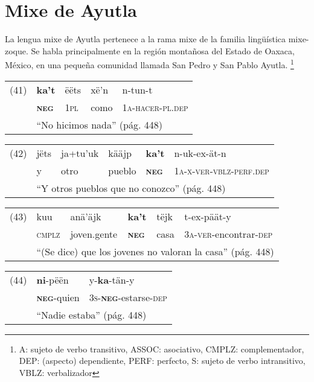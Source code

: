 \section*{Mixe de Ayutla}

\noindent La lengua mixe de Ayutla pertenece a la rama mixe de la familia lingüística mixe-zoque. Se habla principalmente en la región montañosa del Estado de Oaxaca, México, en una pequeña comunidad llamada San Pedro y San Pablo Ayutla. 
\footnote{A: sujeto de verbo transitivo, ASSOC: asociativo, CMPLZ: complementador, DEP: (aspecto) dependiente, PERF: perfecto, S: sujeto de verbo intransitivo, VBLZ: verbalizador}
\vspace{0.5cm}
{\setmainfont{Charis SIL} 

\begin{tabular}{lllll}
(41) & \textbf{ka't} & ëëts & xë'n & n-tun-t \\
& \textsc{\textbf{neg}} & \textsc{1pl} & como & \textsc{1a-hacer-pl.dep} \\
& \multicolumn{4}{l}{``No hicimos nada'' (pág. 448)}
\end{tabular} \vspace{0.3cm}

\begin{tabular}{llllll}
(42) & jëts & ja+tu'uk & kääjp & \textbf{ka't} & n-uk-ex-ät-n \\
& y & otro & pueblo & \textsc{\textbf{neg}} & \textsc{1a-x-ver-vblz-perf.dep} \\
& \multicolumn{5}{l}{``Y otros pueblos que no conozco'' (pág. 448)}
\end{tabular} \vspace{0.3cm}

\begin{tabular}{llllll}
(43) & kuu & anä'äjk & \textbf{ka't} & tëjk & t-ex-päät-y \\
& \textsc{cmplz} & joven.gente & \textsc{\textbf{neg}} & casa & \textsc{3a-ver}-encontrar-\textsc{dep} \\
& \multicolumn{5}{l}{``(Se dice) que los jovenes no valoran la casa'' (pág. 448)}
\end{tabular} \vspace{0.3cm}

\begin{tabular}{lll}
(44) & \textbf{ni}-pëën & y-\textbf{ka}-tän-y \\
& \textsc{\textbf{neg}}-quien & \textsc{3s-\textbf{neg}}-estarse-\textsc{dep} \\
& \multicolumn{2}{l}{``Nadie estaba'' (pág. 448)}
\end{tabular} \vspace{0.5cm}

}
